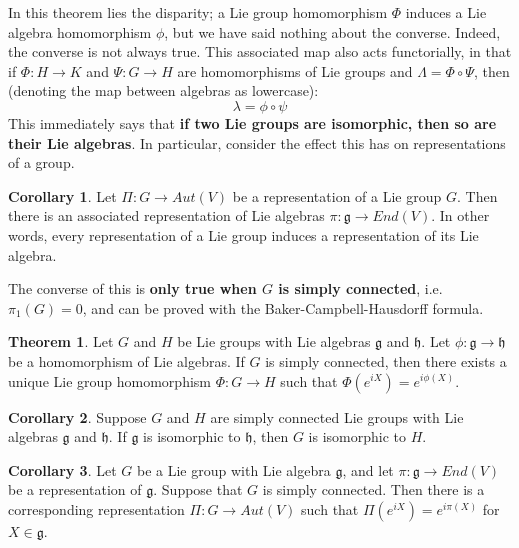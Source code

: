 \documentclass[11pt, oneside]{article}   	%
\theoremstyle{definition}
\newtheorem{theorem}{Theorem}[section]
\newtheorem{corollary}{Corollary}[theorem]
\begin{document}
In this theorem lies the disparity; a Lie group homomorphism $\Phi$ induces a Lie algebra homomorphism $\phi$, 
but we have said nothing about the converse. Indeed, the converse is not always true. This associated map also 
acts functorially, in that if $\Phi : H\rightarrow K$ and $\Psi : G\rightarrow H$ are homomorphisms of Lie groups and 
$\Lambda = \Phi\circ\Psi$, then (denoting the map between algebras as lowercase):
\begin{equation}
	\lambda = \phi\circ\psi
\end{equation}
This immediately says that \textbf{if two Lie groups are isomorphic, then so are their Lie algebras}. In particular, 
consider the effect this has on representations of a group.
\begin{corollary}
	Let $\Pi : G\rightarrow Aut(V)$ be a representation of a Lie group $G$. Then there is an associated 
	representation of Lie algebras $\pi : \mathfrak g\rightarrow End(V)$. In other words, every representation 
	of a Lie group induces a representation of its Lie algebra.
\end{corollary}

The converse of this is \textbf{only true when $G$ is simply connected}, i.e. $\pi_1(G) = 0$, and can be proved with 
the Baker-Campbell-Hausdorff formula. 
\begin{theorem}
	Let $G$ and $H$ be Lie groups with Lie algebras $\mathfrak g$ and $\mathfrak h$. Let $\phi : \mathfrak g
	\rightarrow\mathfrak h$ be a homomorphism of Lie algebras. If $G$ is simply connected, then there exists 
	a unique Lie group homomorphism $\Phi : G\rightarrow H$ such that $\Phi(e^{iX}) = e^{i\phi(X)}$. 
\end{theorem}
\begin{corollary}
	Suppose $G$ and $H$ are simply connected Lie groups with Lie algebras $\mathfrak g$ and $\mathfrak h$. If 
	$\mathfrak g$ is isomorphic to $\mathfrak h$, then $G$ is isomorphic to $H$. 
\end{corollary}
\begin{corollary}
	Let $G$ be a Lie group with Lie algebra $\mathfrak g$, and let $\pi : \mathfrak g\rightarrow End(V)$ be a representation 
	of $\mathfrak g$. Suppose that $G$ is simply connected. Then there is a corresponding representation $\Pi : 
	G\rightarrow Aut(V)$ such that $\Pi(e^{iX}) = e^{i\pi(X)}$ for $X\in\mathfrak g$. 
\end{corollary}
\end{document}
